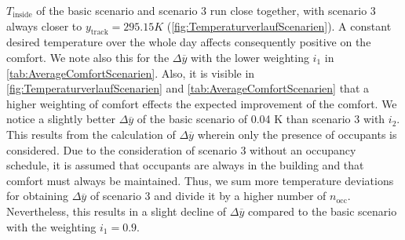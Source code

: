 $T_\text{inside}$ of the basic scenario and scenario 3 run close together, with scenario 3 always closer to $y_\text{track} = 295.15 K$ (\autoref{fig:TemperaturverlaufScenarien}). A constant desired temperature over the whole day affects consequently positive on the comfort. We note also this for the $\Delta \overline{y}$ with the lower weighting $i_\text{1}$ in \autoref{tab:AverageComfortScenarien}. Also, it is visible in \autoref{fig:TemperaturverlaufScenarien} and \autoref{tab:AverageComfortScenarien} that a higher weighting of comfort effects the expected improvement of the comfort. We notice a slightly better $\Delta \overline{y}$ of the basic scenario of 0.04 K than scenario 3 with $i_\text{2}$. This results from the calculation of $\Delta \overline{y}$ wherein only the presence of occupants is considered. Due to the consideration of scenario 3 without an occupancy schedule, it is assumed that occupants are always in the building and that comfort must always be maintained. Thus, we sum more temperature deviations for obtaining $\Delta \overline{y}$ of scenario 3 and divide it by a higher number of $n_\text{occ}$. Nevertheless, this results in a slight decline of $\Delta \overline{y}$ compared to the basic scenario with the weighting $i_\text{1} = 0.9$. \newline

